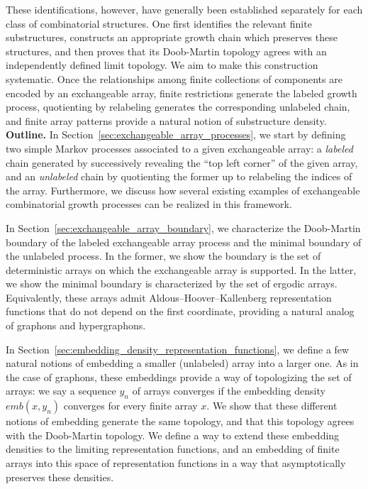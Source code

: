 These identifications, however, have generally been established separately for each
class of combinatorial structures. One first identifies the relevant finite substructures,
constructs an appropriate growth chain which preserves these structures, and then proves that its Doob-Martin topology agrees
with an independently defined limit topology. We aim to make this construction systematic. Once the
relationships among finite collections of components are encoded by an exchangeable array,
finite restrictions generate the labeled growth process, quotienting by relabeling generates the
corresponding unlabeled chain, and finite array patterns provide a natural notion of substructure density.\\


\noindent \textbf{Outline.} In Section~\ref{sec:exchangeable_array_processes}, we start by
defining two simple Markov processes associated to a given exchangeable array: a \textit{labeled}
chain generated by successively revealing the ``top left corner'' of the given array, and an \textit{unlabeled}
chain by quotienting the former up to relabeling the indices of the array. Furthermore, we discuss
how several existing examples of exchangeable combinatorial growth processes can be realized in this framework.

In Section~\ref{sec:exchangeable_array_boundary}, we characterize the Doob-Martin boundary of the
labeled exchangeable array process and the minimal boundary of the unlabeled process. In the former, we show the boundary is the set of
deterministic arrays on which the exchangeable array is supported. In the latter, we show the minimal boundary
is characterized by the set of ergodic arrays. Equivalently, these arrays admit Aldous--Hoover--Kallenberg
representation functions that do not depend on the first coordinate, providing a natural analog of graphons and hypergraphons.

In Section~\ref{sec:embedding_density_representation_functions}, we define a few natural notions
of embedding a smaller (unlabeled) array into a larger one. As in the case of graphons, these embeddings provide
a way of topologizing the set of arrays: we say a sequence $y_n$ of arrays converges if the embedding density
$emb(x, y_n)$ converges for every finite array $x$. We show that these different notions of embedding
generate the same topology, and that this topology agrees with the Doob-Martin topology. We define a way
to extend these embedding densities to the limiting representation functions, and an
embedding of finite arrays into this space of representation functions in a way that
asymptotically preserves these densities.

